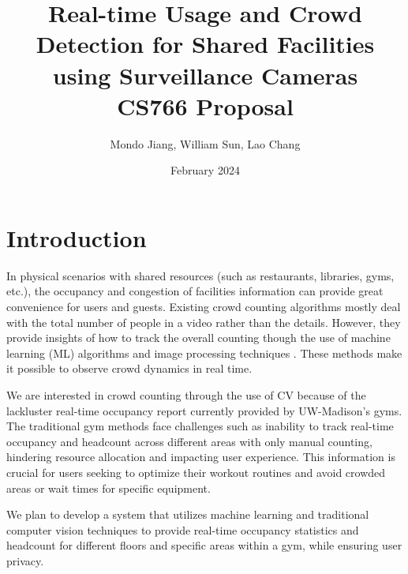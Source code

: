 \documentclass{article}
\title{%
    Real-time Usage and Crowd Detection for Shared Facilities using Surveillance Cameras\\
  \large CS766 Proposal}
\author{Mondo Jiang, William Sun, Lao Chang}
\date{February 2024}
\begin{document}
\maketitle


\section{Introduction}
In physical scenarios with shared resources (such as restaurants, libraries, gyms, etc.), the occupancy and congestion of facilities information can provide great convenience for users and guests. Existing crowd counting algorithms mostly deal with the total number of people in a video rather than the details. However, they provide insights of how to track the overall counting though the use of machine learning (ML) algorithms and image processing techniques \cite{Chen_2020}. These methods make it possible to observe crowd dynamics in real time. 

We are interested in crowd counting through the use of CV because of the lackluster real-time occupancy report currently provided by UW-Madison's gyms. The traditional gym methods face challenges such as inability to track real-time occupancy and headcount across different areas with only manual counting, hindering resource allocation and impacting user experience\cite{bakke}. This information is crucial for users seeking to optimize their workout routines and avoid crowded areas or wait times for specific equipment.

We plan to develop a system that utilizes machine learning and traditional computer vision techniques to provide real-time occupancy statistics and headcount for different floors and specific areas within a gym, while ensuring user privacy.
\end{document}

